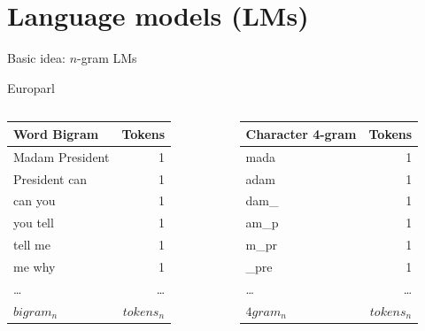 \documentclass{beamer}\usepackage[]{graphicx}\usepackage[]{color}
\newcommand{\corp}[1]{\texttt{#1}}
\begin{document}
  \section{Language models (LMs)}
    \begin{frame}{Basic idea: $n$-gram LMs}
      \begin{block}{Europarl \parencite{koehn_europarl:_2009}}
        \corp{}
      \end{block}
      \begin{columns}
          \begin{tabular}{l r}
            Word Bigram     & Tokens \\
            \hline
            Madam President & 1 \\
            President can   & 1 \\
            can you         & 1 \\
            you tell        & 1 \\
            tell me         & 1 \\
            me why          & 1 \\
            \ldots         & \ldots \\
            $bigram_n$      & $tokens_n$
          \end{tabular}
        \begin{tabular}{l r}
          Character 4-gram & Tokens \\
          \hline
          mada             & 1 \\
          adam             & 1 \\
          dam\_            & 1 \\
          am\_p            & 1 \\
          m\_pr            & 1 \\
          \_pre            & 1 \\
          \ldots           & \ldots \\
          $4gram_n$        & $tokens_n$
        \end{tabular}
      \end{columns}
    \end{frame}
\end{document}

